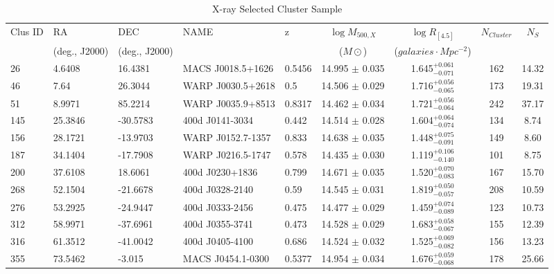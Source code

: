 \documentclass[apj,twocolumn]{emulateapj}
\begin{document}
{\begin{table} [h!]
\caption{X-ray Selected Cluster Sample}
\label{table:1} 
\centering
\tiny
\begin{tabular}{l l l l l c c c c}     %
\hline
\hline
Clus ID	& RA	 & DEC	& NAME	& z & $\log M_{500, X}$  & 	$\log R_{[4.5]}$ & $N_{Cluster}$ &  $N_{S}$ \\
                  & (deg., J2000) & (deg., J2000) & &  & ($M\odot$) & ($galaxies \cdot Mpc^{-2}$) & & \\
\hline
\hline
  26   &  4.6408   & 16.4381  & MACS J0018.5+1626   & 0.5456 & 14.995 $\pm$  0.035  &     1.645$^{+0.061}_{-0.071}$  &       162 & 14.32 \\
  46   &  7.64     & 26.3044  & WARP J0030.5+2618   & 0.5    & 14.506 $\pm$  0.029  &     1.716$^{+0.056}_{-0.065}$  &       173 & 19.31 \\
  51   &  8.9971   & 85.2214  & WARP J0035.9+8513   & 0.8317 & 14.462 $\pm$  0.034  &     1.721$^{+0.056}_{-0.064}$  &       242 & 37.17 \\
  145  &  25.3846  & -30.5783 & 400d J0141-3034     & 0.442  & 14.514 $\pm$  0.028  &     1.604$^{+0.064}_{-0.074}$  &       134 & 8.74  \\
  156  &  28.1721  & -13.9703 & WARP J0152.7-1357   & 0.833  & 14.638 $\pm$  0.035  &     1.448$^{+0.075}_{-0.091}$  &       149 & 8.60  \\
  187  &  34.1404  & -17.7908 & WARP J0216.5-1747   & 0.578  & 14.435 $\pm$  0.030  &     1.119$^{+0.106}_{-0.140}$  &       101 & 8.75  \\
  200  &  37.6108  & 18.6061  & 400d J0230+1836     & 0.799  & 14.671 $\pm$  0.035  &     1.520$^{+0.070}_{-0.083}$  &       167 & 15.70 \\ 
  268  &  52.1504  & -21.6678 & 400d J0328-2140     & 0.59   & 14.545 $\pm$  0.031  &     1.819$^{+0.050}_{-0.057}$  &       208 & 10.59 \\
  276  &  53.2925  & -24.9447 & 400d J0333-2456     & 0.475  & 14.477 $\pm$  0.029  &     1.459$^{+0.074}_{-0.089}$  &       123 & 10.73 \\
  312  &  58.9971  & -37.6961 & 400d J0355-3741     & 0.473  & 14.528 $\pm$  0.029  &     1.683$^{+0.058}_{-0.067}$  &       155 & 12.39 \\
  316  &  61.3512  & -41.0042 & 400d J0405-4100     & 0.686  & 14.524 $\pm$  0.032  &     1.525$^{+0.069}_{-0.082}$  &       156 & 13.23 \\
  355  &  73.5462  & -3.015   & MACS J0454.1-0300   & 0.5377 & 14.954 $\pm$  0.034  &     1.676$^{+0.059}_{-0.068}$  &       178 & 25.66 \\

\end{tabular}
\end{table}}
\end{document}
